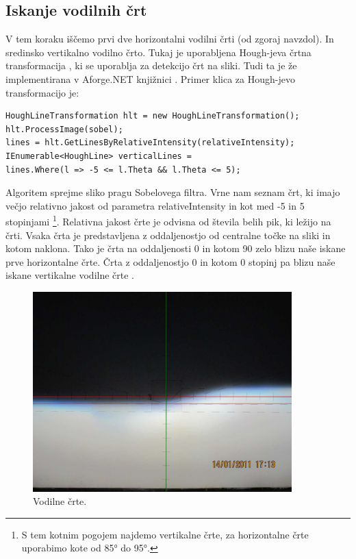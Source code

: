 \documentclass[oneside, a4paper, 12pt]{book}
\begin{document}
\subsection{Iskanje vodilnih črt}
V tem koraku iščemo prvi dve horizontalni vodilni črti (od zgoraj navzdol). In sredinsko vertikalno vodilno črto. Tukaj je uporabljena Hough-jeva črtna transformacija \cite{hough-wiki}, ki se uporablja za detekcijo črt na sliki. Tudi ta je že implementirana v Aforge.NET knjižnici \cite{hough}. Primer klica za Hough-jevo transformacijo je:

\begin{verbatim}
HoughLineTransformation hlt = new HoughLineTransformation();
hlt.ProcessImage(sobel);
lines = hlt.GetLinesByRelativeIntensity(relativeIntensity);
IEnumerable<HoughLine> verticalLines = 
lines.Where(l => -5 <= l.Theta && l.Theta <= 5);
\end{verbatim}


Algoritem sprejme sliko pragu Sobelovega filtra. Vrne nam seznam črt, ki imajo večjo relativno jakost od parametra relativeIntensity \cite{hough} in kot med -5 in 5 stopinjami \footnote{S tem kotnim pogojem najdemo vertikalne črte, za horizontalne črte uporabimo kote od 85° do 95°.}. Relativna jakost črte je odvisna od števila belih pik, ki ležijo na črti. Vsaka črta je predstavljena z oddaljenostjo od centralne točke na sliki in kotom naklona. Tako je črta na oddaljenosti 0 in kotom 90 zelo blizu naše iskane prve horizontalne črte. Črta z oddaljenostjo 0 in kotom 0 stopinj pa blizu naše iskane vertikalne vodilne črte \cite{hough}. 

\begin{figure}
\begin{center}
\includegraphics[width=10cm]{slike/vodilne-crte.jpg}
\end{center}
\caption{Vodilne črte.}
\label{pic:vodilne-crte}
\end{figure}
\end{document}
